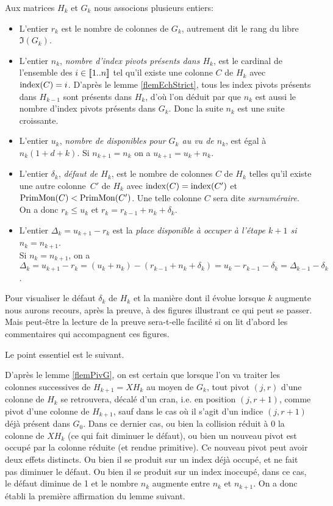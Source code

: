Aux  matrices $H_k$ et $G_k$ nous associons plusieurs entiers: 
\begin{itemize}
%
\item L'entier $r_k$ est le nombre de colonnes de $G_k$, autrement dit le rang du \Vmo libre $\Im(G_k)$.
%
\item L'entier $n_k$, \textsl{nombre d'index pivots présents dans $H_k$}, est le cardinal de l'ensemble des $i\in[ \negthinspace [1..n] \negthinspace ]$ tel qu'il existe une colonne $C$ de $H_k$ avec $\mathrm{index}(C)=i$.
D'après le lemme \ref{flemEchStrict}, tous les index pivots présents
dans $H_{k-1}$ sont présents dans $H_k$, d'où l'on déduit par \recu
que  $n_k$ est aussi le nombre d'index pivots présents dans $G_k$. Donc la suite $n_k$ est une suite croissante.
%
\item L'entier $u_k$, \textsl{nombre de \coos disponibles pour $G_k$ au vu de $n_k$}, est égal à $n_k(1+d+k)$. Si $n_{k+1}=n_k$ 
on a $u_{k+1}=u_k+n_k$.
%
\item L'entier $\delta_k$, \textsl{défaut de $H_k$}, est le nombre de colonnes $C$
de $H_k$ telles qu'il existe une autre colonne~$C'$ de $H_k$ 
avec $\mathrm{index}(C)=\mathrm{index}(C')$
et $\mathrm{PrimMon}(C)<\mathrm{PrimMon}(C')$. Une telle colonne $C$ sera dite \textsl{surnuméraire}.  On a donc $r_k\leq u_k$ et $r_k=r_{k-1}+n_k+\delta_k$.
%
\item L'entier $\Delta_k=u_{k+1}-r_k$ est la \textsl{place disponible à occuper à l'étape $k+1$
si $n_k=n_{k+1}$}.\\ Si $n_k=n_{k+1}$, on a $\Delta_k=u_{k+1}-r_k=(u_k+n_k)-(r_{k-1}+n_k+\delta_k)=u_k-r_{k-1}-\delta_k=\Delta_{k-1}-\delta_k$. 
\end{itemize}

\medskip 
Pour visualiser le défaut $\delta_k$ de $H_k$ et la manière dont il évolue
lorsque $k$ augmente nous aurons recours, après la preuve, à 
des figures illustrant ce qui peut se passer.
Mais peut-\^etre la lecture de la preuve sera-t-elle facilité si on lit d'abord les commentaires qui accompagnent ces figures.

Le point essentiel est le suivant. 

D'après le lemme  \ref{flemPivG}, on est certain que lorsque l'on va traiter
les colonnes successives de $H_{k+1}=XH_k$ au moyen de $G_k$, 
tout pivot  $(j,r)$ d'une colonne de $H_k$ se retrouvera, décalé d'un cran,
i.e. en position $(j,r+1)$, comme pivot 
d'une colonne  de $H_{k+1}$, sauf dans le cas où il s'agit d'un indice
$(j,r+1)$  déjà présent dans $G_0$.
Dans ce dernier cas, ou bien la collision réduit à $0$ la colonne
de $XH_k$ (ce qui fait diminuer le défaut), ou bien un nouveau pivot est occupé par la colonne réduite
(et rendue primitive). Ce nouveau pivot peut avoir deux effets distincts.
Ou bien il se produit sur un index déjà occupé, et ne fait pas diminuer le défaut. Ou bien il se produit sur un index inoccupé, dans ce cas,  
le défaut diminue de 1 et le nombre $n_k$ augmente entre  $n_k$ et $n_{k+1}$. 
On a donc établi la première affirmation du lemme suivant.  


